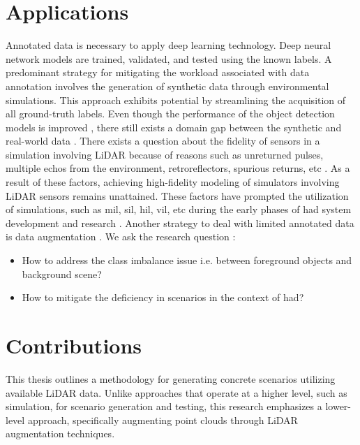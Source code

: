 \section{Applications}
Annotated data is necessary to apply deep learning technology. Deep neural network models are trained, validated, and tested using the known labels. A predominant strategy for mitigating the workload associated with data annotation involves the generation of synthetic data through environmental simulations. This approach exhibits potential by streamlining the acquisition of all ground-truth labels. Even though the performance of the object detection models is improved \parencite{johnsonroberson2017driving}, there still exists a domain gap between the synthetic and real-world data \parencite{care_real_and_syn_gap}. There exists a question about the fidelity of sensors in a simulation involving LiDAR because of reasons such as unreturned pulses, multiple echos from the environment, retroreflectors, spurious returns, etc \parencite{zero_domain_gap}. As a result of these factors, achieving high-fidelity modeling of simulators involving LiDAR sensors remains unattained. These factors have prompted the utilization of simulations, such as \acrfull{mil}, \acrfull{sil}, \acrfull{hil}, \acrfull{vil}, etc during the early phases of \acrshort{had} system development and research \parencite{x_in_loop}. Another strategy to deal with limited annotated data is data augmentation \parencite{lidar_aug}. We ask the research question : 
\begin{itemize}
    \item How to address the class imbalance issue i.e. between foreground objects and background scene?
    \item How to mitigate the deficiency in scenarios in the context of \acrshort{had}?
\end{itemize}

\section{Contributions}

This thesis outlines a methodology for generating concrete scenarios utilizing available LiDAR data. Unlike approaches that operate at a higher level, such as simulation, for scenario generation and testing, this research emphasizes a lower-level approach, specifically augmenting point clouds through LiDAR augmentation techniques.

